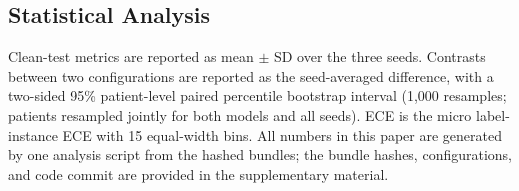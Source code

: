 \subsection{Statistical Analysis}
Clean-test metrics are reported as mean $\pm$ SD over the three seeds. Contrasts between two configurations are reported as the seed-averaged difference, with a two-sided 95\% patient-level paired percentile bootstrap interval (1{,}000 resamples; patients resampled jointly for both models and all seeds). ECE is the micro label-instance ECE with 15 equal-width bins. All numbers in this paper are generated by one analysis script from the hashed bundles; the bundle hashes, configurations, and code commit are provided in the supplementary material.
